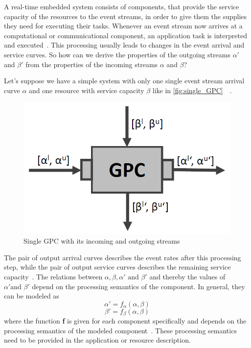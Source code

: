 \label{component}

A real-time embedded system consists of components, that provide the service capacity of the resources to the event streams, in order to give them the supplies they need for
executing their tasks.
Whenever an event stream now arrives at a computational or communicational component, an application task is interpreted and executed~\cite{wan:06}.
This processing usually leads to changes in the event arrival and service curves.
So how can we derive the properties of the outgoing streams \(\alpha'\) and \(\beta'\) from the properties of the incoming streams \(\alpha\) and \(\beta\)?

Let's suppose we have a simple system with only one single event stream arrival curve \(\alpha\) and one resource with service capacity \(\beta\) like in \autoref{fig:single_GPC}~\cite{ver}~\cite{thi:00}.

\begin{figure}
    \centering
    \includegraphics[width=0.7\columnwidth]{graphics/single_GPC.png}
    \caption{Single GPC with its incoming and outgoing streams}\label{fig:single_GPC}
\end{figure}

The pair of output arrival curves describes the event rates after this processing step, while the pair of output service curves describes the remaining service capacity~\cite{wan:06}.
The relations between \(\alpha, \beta, \alpha' \text{ and } \beta'\) and thereby the values of \(\alpha' \text {and } \beta'\) depend on the processing semantics of the component.
In general, they can be modeled as
\[ \alpha' = f_\alpha (\alpha, \beta)\] 
\[\beta' = f_\beta (\alpha, \beta) \]
where the function \textbf{f} is given for each component specifically and
depends on the processing semantics of the modeled component~\cite{wan:06}.
These processing semantics need to be provided in the application or resource description.

